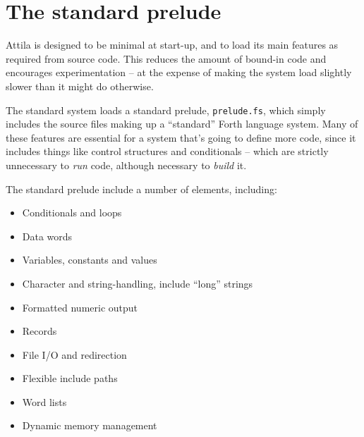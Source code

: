 
\chapter{The standard prelude}
\label{chap:standard-prelude}

Attila is designed to be minimal at start-up, and to load its main
features as required from source code. This reduces the amount of
bound-in code and encourages experimentation -- at the expense of
making the system load slightly slower than it might do otherwise.

The standard system loads a standard prelude, \texttt{prelude.fs},
which simply includes the source files making up a ``standard'' Forth
language system. Many of these features are essential for a system
that's going to define more code, since it includes things like
control structures and conditionals -- which are strictly unnecessary
to \emph{run} code, although necessary to \emph{build} it.

The standard prelude include a number of elements, including:

\begin{itemize}
\item Conditionals and loops
\item Data words
\item Variables, constants and values
\item Character and string-handling, include ``long'' strings
\item Formatted numeric output
\item Records
\item File I/O and redirection
\item Flexible include paths
\item Word lists
\item Dynamic memory management
\end{itemize}

